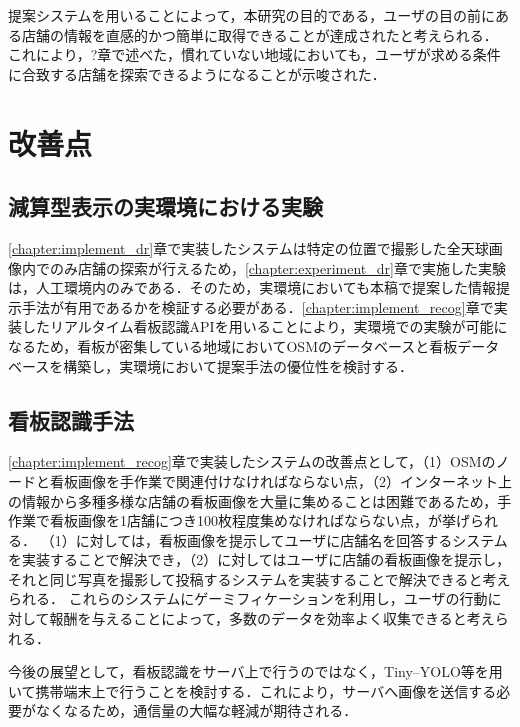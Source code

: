   提案システムを用いることによって，本研究の目的である，ユーザの目の前にある店舗の情報を直感的かつ簡単に取得できることが達成されたと考えられる．
  これにより，?章で述べた，慣れていない地域においても，ユーザが求める条件に合致する店舗を探索できるようになることが示唆された．

\section{改善点}
  \subsection{減算型表示の実環境における実験}
    \ref{chapter:implement_dr}章で実装したシステムは特定の位置で撮影した全天球画像内でのみ店舗の探索が行えるため，\ref{chapter:experiment_dr}章で実施した実験は，人工環境内のみである．そのため，実環境においても本稿で提案した情報提示手法が有用であるかを検証する必要がある．\ref{chapter:implement_recog}章で実装したリアルタイム看板認識APIを用いることにより，実環境での実験が可能になるため，看板が密集している地域においてOSMのデータベースと看板データベースを構築し，実環境において提案手法の優位性を検討する．

  \subsection{看板認識手法}
    \ref{chapter:implement_recog}章で実装したシステムの改善点として，（1）OSMのノードと看板画像を手作業で関連付けなければならない点，（2）インターネット上の情報から多種多様な店舗の看板画像を大量に集めることは困難であるため，手作業で看板画像を1店舗につき100枚程度集めなければならない点，が挙げられる．
    （1）に対しては，看板画像を提示してユーザに店舗名を回答するシステムを実装することで解決でき，（2）に対してはユーザに店舗の看板画像を提示し，それと同じ写真を撮影して投稿するシステムを実装することで解決できると考えられる．
    これらのシステムにゲーミフィケーションを利用し，ユーザの行動に対して報酬を与えることによって，多数のデータを効率よく収集できると考えられる．
    
    今後の展望として，看板認識をサーバ上で行うのではなく，Tiny--YOLO等を用いて携帯端末上で行うことを検討する．これにより，サーバへ画像を送信する必要がなくなるため，通信量の大幅な軽減が期待される．

